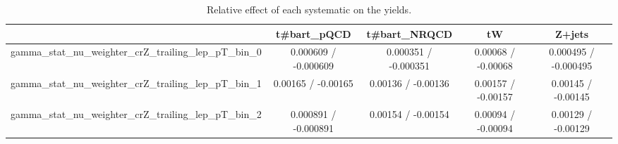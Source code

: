 \documentclass[10pt]{article}
\begin{document}
\begin{table}[htbp]
\begin{center}
\begin{tabular}{|c|c|c|c|c|}
\hline 
      & t#bar{t}_{pQCD}      & t#bar{t}_{NRQCD}      & tW      & Z+jets \\ 
\hline 
  gamma_stat_nu_weighter_crZ_trailing_lep_pT_bin_0 & 0.000609 / -0.000609 & 0.000351 / -0.000351 & 0.00068 / -0.00068 & 0.000495 / -0.000495 \\ 
  gamma_stat_nu_weighter_crZ_trailing_lep_pT_bin_1 & 0.00165 / -0.00165 & 0.00136 / -0.00136 & 0.00157 / -0.00157 & 0.00145 / -0.00145 \\ 
  gamma_stat_nu_weighter_crZ_trailing_lep_pT_bin_2 & 0.000891 / -0.000891 & 0.00154 / -0.00154 & 0.00094 / -0.00094 & 0.00129 / -0.00129 \\ 
\hline 
\end{tabular} 
\caption{Relative effect of each systematic on the yields.} 
\end{center} 
\end{table} 
\end{document}
